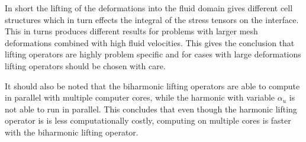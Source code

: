In short the lifting of the deformations into the fluid domain gives different cell structures which in turn effects the integral of the stress tensors on the interface. This in turns produces different results for problems with larger mesh deformations combined with high fluid velocities. This gives the conclusion that lifting operators are highly problem specific and for cases with large deformations lifting operators should be chosen with care.

It should also be noted that the biharmonic lifting operators are able to compute in parallel with multiple computer cores, while the harmonic with variable $\alpha_u$ is not able to run in parallel. This concludes that even though the harmonic lifting operator is is less computationally costly, computing on multiple cores is faster with the biharmonic lifting operator.






